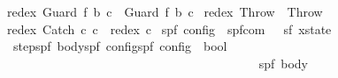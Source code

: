 \begin{isabellebody}
{\isachardoublequoteopen}redex\ {\isacharparenleft}Guard\ f\ b\ c{\isacharparenright}\ {\isacharequal}\ {\isacharparenleft}Guard\ f\ b\ c{\isacharparenright}{\isachardoublequoteclose}\ {\isacharbar}\isanewline
{\isachardoublequoteopen}redex\ {\isacharparenleft}Throw{\isacharparenright}\ {\isacharequal}\ Throw{\isachardoublequoteclose}\ {\isacharbar}\isanewline
{\isachardoublequoteopen}redex\ {\isacharparenleft}Catch\ c\ c\ {\isacharequal}\ redex\ c%
\isamarkuptrue%
\isamarkupfalse%
\ {\isacharparenleft}{\isacharprime}s{\isacharcomma}{\isacharprime}p{\isacharcomma}{\isacharprime}f{\isacharparenright}\ config\ {\isacharequal}\ {\isachardoublequoteopen}{\isacharparenleft}{\isacharprime}s{\isacharcomma}{\isacharprime}p{\isacharcomma}{\isacharprime}f{\isacharparenright}com\ \ {\isasymtimes}\ {\isacharparenleft}{\isacharprime}s{\isacharcomma}{\isacharprime}f{\isacharparenright}\ xstate{\isachardoublequoteclose}\isanewline
{}\isamarkupfalse%
\ {\isachardoublequoteopen}step{\isachardoublequoteclose}{\isacharcolon}{\isacharcolon}{\isachardoublequoteopen}{\isacharbrackleft}{\isacharparenleft}{\isacharprime}s{\isacharcomma}{\isacharprime}p{\isacharcomma}{\isacharprime}f{\isacharparenright}\ body{\isacharcomma}{\isacharparenleft}{\isacharprime}s{\isacharcomma}{\isacharprime}p{\isacharcomma}{\isacharprime}f{\isacharparenright}\ config{\isacharcomma}{\isacharparenleft}{\isacharprime}s{\isacharcomma}{\isacharprime}p{\isacharcomma}{\isacharprime}f{\isacharparenright}\ config{\isacharbrackright}\ {\isasymRightarrow}\ bool{\isachardoublequoteclose}\isanewline
\ \ \ \ \ \ \ \ \ \ \ \ \ \ \ \ \ \ \ \ \ \ \ \ \ \ \ \ \ \ \ \ {\isacharparenleft}{\isachardoublequoteopen}{\isacharunderscore}{\isasymturnstile}\ {\isacharparenleft}{\isacharunderscore}\ {\isasymrightarrow}{\isacharslash}\ {\isacharunderscore}{\isacharparenright}{\isachardoublequoteclose}\ {\isacharbrackleft}{}{}{\isacharcomma}{}{}{\isacharcomma}{}{}{\isacharbrackright}\ {}{}{}{\isacharparenright}\isanewline
\ \ \ {\isasymGamma}{\isacharcolon}{\isacharcolon}{\isachardoublequoteopen}{\isacharparenleft}{\isacharprime}s{\isacharcomma}{\isacharprime}p{\isacharcomma}{\isacharprime}f{\isacharparenright}\ body{\isachardoublequoteclose}\isanewline

\end{isabellebody}
